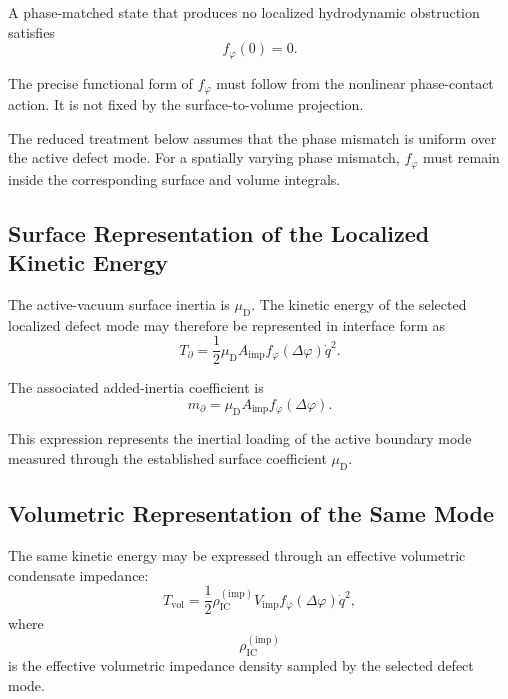A phase-matched state that produces no localized hydrodynamic obstruction satisfies
\begin{equation}
    \boxed{ f_{\varphi}(0) = 0 }.
\end{equation}

The precise functional form of $f_{\varphi}$ must follow from the nonlinear phase-contact action. It is not fixed by the surface-to-volume projection.

The reduced treatment below assumes that the phase mismatch is uniform over the active defect mode. For a spatially varying phase mismatch, $f_{\varphi}$ must remain inside the corresponding surface and volume integrals.

\subsection{Surface Representation of the Localized Kinetic Energy}

The active-vacuum surface inertia is $\mu_{\mathrm{D}}$. The kinetic energy of the selected localized defect mode may therefore be represented in interface form as
\begin{equation}
    \boxed{ T_{\partial} = \frac{1}{2} \mu_{\mathrm{D}} A_{\mathrm{imp}} f_{\varphi}(\Delta\varphi) \dot{q}^2 }.
\end{equation}

The associated added-inertia coefficient is
\begin{equation}
    \boxed{ m_{\partial} = \mu_{\mathrm{D}} A_{\mathrm{imp}} f_{\varphi}(\Delta\varphi) }.
\end{equation}

This expression represents the inertial loading of the active boundary mode measured through the established surface coefficient $\mu_{\mathrm{D}}$.

\subsection{Volumetric Representation of the Same Mode}

The same kinetic energy may be expressed through an effective volumetric condensate impedance:
\begin{equation}
    \boxed{ T_{\mathrm{vol}} = \frac{1}{2} \rho_{\mathrm{IC}}^{(\mathrm{imp})} V_{\mathrm{imp}} f_{\varphi}(\Delta\varphi) \dot{q}^2 },
\end{equation}
where
\begin{equation}
    \rho_{\mathrm{IC}}^{(\mathrm{imp})}
\end{equation}
is the effective volumetric impedance density sampled by the selected defect mode.


